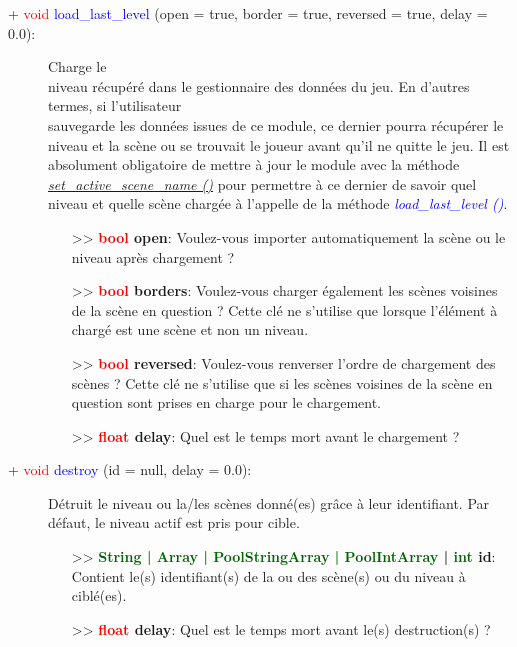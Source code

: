 \documentclass[a4paper, 11pt]{article}
\begin{document}
	\begin{description}
		\item [+ \textcolor{red}{void} \textcolor{blue}{load\_last\_level} (open = true, border = true, 
		reversed = true, delay = 0.0):] Charge le \\niveau récupéré dans le gestionnaire des données du jeu. 
		En d'autres termes, si l'utilisateur \\sauvegarde les données issues de ce module, ce dernier pourra
		récupérer le niveau et la scène ou se trouvait le joueur avant qu'il ne quitte le jeu. Il est 
		absolument obligatoire de mettre à jour le module avec la méthode \textit{\hyperlink{activescene}
		{set\_active\_scene\_name ()}} pour permettre à ce dernier de savoir quel niveau et quelle scène 
		chargée à l'appelle de la méthode \textit{\textcolor{blue}{load\_last\_level ()}}.
		\begin{itemize}
			\item[>> \textbf{\textcolor{red}{bool} open}:] Voulez-vous importer automatiquement la scène ou 
			le niveau après chargement ?
			\item[>> \textbf{\textcolor{red}{bool} borders}:] Voulez-vous charger également les scènes 
			voisines de la scène en question ? Cette clé ne s'utilise que lorsque l'élément à chargé est une 
			scène et non un niveau.
			\item[>> \textbf{\textcolor{red}{bool} reversed}:] Voulez-vous renverser l'ordre de chargement 
			des scènes ? Cette clé ne s'utilise que si les scènes voisines de la scène en question sont 
			prises en charge pour le chargement.
			\item [>> \textbf{\textcolor{red}{float} delay}:] Quel est le temps mort avant le chargement ?\\
		\end{itemize}
	\end{description}
	\begin{description}
		\item [+ \textcolor{red}{void} \textcolor{blue}{destroy} (id = null, delay = 0.0):] Détruit le 
		niveau ou la/les scènes donné(es) grâce à leur identifiant. Par défaut, le niveau actif est pris 
		pour cible.
		\begin{itemize}
			\item [>> \textbf{\textcolor{darkgreen}{String | Array | PoolStringArray | PoolIntArray} | 
			\textcolor{darkgreen}{int} id}:] Contient le(s) identifiant(s) de la ou des scène(s) ou du 
			niveau à ciblé(es).
			\item [>> \textbf{\textcolor{red}{float} delay}:] Quel est le temps mort avant le(s) 
			destruction(s) ?\\
		\end{itemize}
	\end{description}
\end{document}
